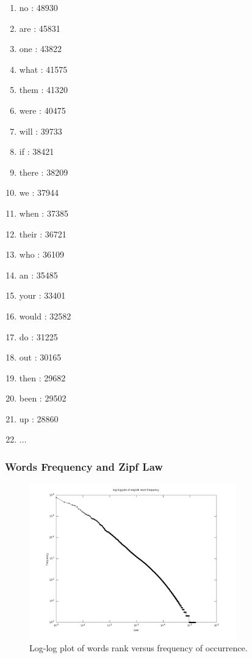 \documentclass{beamer}
\begin{document}
{\begin{tiny}
\begin{multicols}{4}
\begin{enumerate}
	\item no : 48930
	\item are : 45831
	\item one : 43822
	\item what : 41575
	\item them : 41320
	\item were : 40475
	\item will : 39733
	\item if : 38421
	\item there : 38209
	\item we : 37944
	\item when : 37385
	\item their : 36721
	\item who : 36109
	\item an : 35485
	\item your : 33401
	\item would : 32582
	\item do : 31225
	\item out : 30165
	\item then : 29682
	\item been : 29502
	\item up : 28860
	\item[] $\ldots$
\end{enumerate}
\end{multicols}
\end{tiny}
}


\frame
{
  \frametitle{Words Frequency and Zipf Law}
  \vspace{-0.25cm}
  \begin{figure}[h!]
  \centering
  \includegraphics[width=0.8\textwidth]{images/wordfrequency_en.png}
  \vspace{-0.6cm}
  \caption{Log-log plot of words rank versus frequency of occurrence.}
  \label{fig:wordfrequency_en}
  \end{figure} 
}
\end{document}
